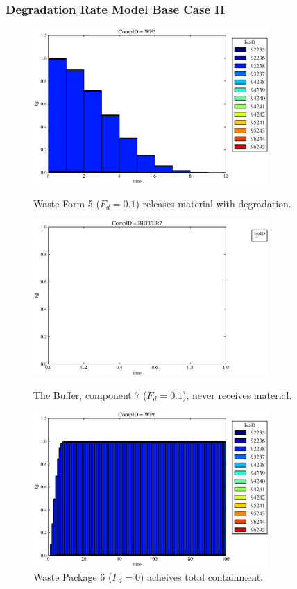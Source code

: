 \begin{frame}
  \frametitle{Degradation Rate Model Base Case II}
  \begin{figure}
\begin{minipage}[b]{0.45\linewidth}

  \includegraphics[width=0.8\textwidth]{./images/drII1.eps}
  \caption[DRII Waste Form Contaminants.]{
    Waste Form 5 ($F_d = 0.1$) releases material with degradation. 
    }
  \label{fig:drIIwf5}
  
  \includegraphics[width=0.8\textwidth]{./images/drII3.eps}
  \caption[Case DRII Buffer Contaminants]{
    The Buffer, component 7 ($F_d = 0.1$), never receives material.
    }
  \label{fig:drIIbuff}

\end{minipage}
\hspace{0.05\linewidth}
\begin{minipage}[b]{0.45\linewidth}
  \includegraphics[width=0.8\textwidth]{./images/drII2.eps}
  \caption[Case DRII Waste Package Contaminants.]{ 
    Waste Package 6 ($F_d = 0$) acheives total containment.
    }
  \label{fig:drIIwp6}


\end{minipage}
\end{figure}
\end{frame}
